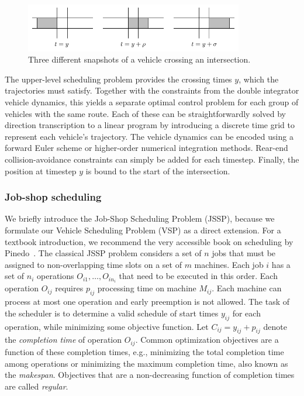 \documentclass[notitlepage]{report}
\begin{document}
\begin{figure}[h]
  \centering
  \includegraphics[width=0.85\textwidth]{figures/vehicle_crossing.pdf}
  \caption{Three different snapshots of a vehicle crossing an intersection.}
  \label{fig:vehicle_crossing}
\end{figure}

The upper-level scheduling problem provides the crossing times $y$,
which the trajectories must satisfy. Together with the constraints from the
double integrator vehicle dynamics, this yields a separate optimal control
problem for each group of vehicles with the same route.
Each of these can be straightforwardly solved by direction transcription to a
linear program by introducing a discrete time grid to represent each vehicle's
trajectory. The vehicle dynamics can be encoded using a forward Euler scheme or
higher-order numerical integration methods. Rear-end collision-avoidance
constraints can simply be added for each timestep. Finally, the position at
timestep $y$ is bound to the start of the intersection.


\subsubsection*{Job-shop scheduling}

We briefly introduce the Job-Shop Scheduling Problem (JSSP), because we
formulate our Vehicle Scheduling Problem (VSP) as a direct extension. For a
textbook introduction, we recommend the very accessible book on scheduling by
Pinedo~\cite{pinedoSchedulingTheoryAlgorithms2016}.
%
The classical JSSP problem considers a set of $n$ jobs that must be assigned to
non-overlapping time slots on a set of $m$ machines. Each job $i$ has a set of
$n_{i}$ operations $O_{i1}, \dots, O_{in_{i}}$ that need to be executed in this
order. Each operation $O_{ij}$ requires $p_{ij}$ processing time on machine
$M_{ij}$. Each machine can process at most one operation and early preemption is
not allowed. The task of the scheduler is to determine a valid schedule of start
times $y_{ij}$ for each operation, while minimizing some objective function. Let
$C_{ij} = y_{ij} + p_{ij}$ denote the \textit{completion time} of operation $O_{ij}$.
Common optimization objectives are a function of these completion times, e.g.,
minimizing the total completion time among operations or minimizing the maximum
completion time, also known as the \textit{makespan}. Objectives that are a
non-decreasing function of completion times are called \textit{regular}.
\end{document}
